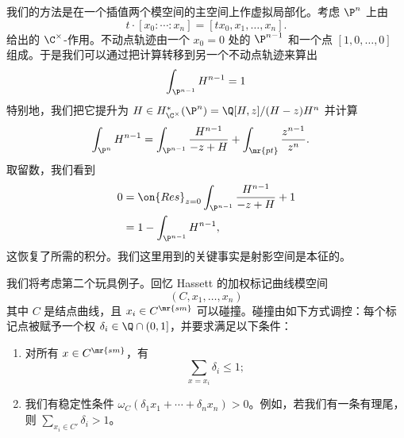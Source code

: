 我们的方法是在一个插值两个模空间的主空间上作虚拟局部化。考虑 \(\P^n\) 上由
\[ t \cdot [x_0 : \cdots : x_n] = [t x_0, x_1, \ldots, x_n]. \]
给出的 \(\C^{\times}\)-作用。不动点轨迹由一个 \(x_0 = 0\) 处的 \(\P^{n-1}\) 和一个点 \([1, 0, \ldots, 0]\) 组成。于是我们可以通过把计算转移到另一个不动点轨迹来算出
\[ \int_{\P^{n-1}} H^{n-1} = 1 \]
特别地，我们把它提升为 \(H \in H_{\C^{\times}}^* (\P^n) = \Q[H,z] / (H-z)H^n\) 并计算
\begin{align*}
    \int_{\P^n} H^{n-1} &= \int_{\P^{n-1}} \frac{H^{n-1}}{-z+H} + \int_{\mr{pt}} \frac{z^{n-1}}{z^n}.
\end{align*}
取留数，我们看到
\begin{align*}
    0 &= \on{Res}_{z = 0}\int_{\P^{n-1}} \frac{H^{n-1}}{-z+H} + 1 \\
    &= 1 - \int_{\P^{n-1}}H^{n-1},
\end{align*}
这恢复了所需的积分。我们这里用到的关键事实是射影空间是本征的。

\begin{exm}[第二个玩具例子]
    我们将考虑第二个玩具例子。回忆 Hassett 的加权标记曲线模空间
    \[ (C, x_1, \ldots, x_n) \]
    其中 \(C\) 是结点曲线，且 \(x_i \in C^{\mr{sm}}\) 可以碰撞。碰撞由如下方式调控：每个标记点被赋予一个权 \(\delta_i \in \Q \cap (0,1]\)，并要求满足以下条件：
    \begin{enumerate}
        \item 对所有 \(x \in C^{\mr{sm}}\)，有
            \[ \sum_{x = x_i} \delta_i \leq 1; \]
        \item 我们有稳定性条件 \(\omega_C(\delta_1 x_1 + \cdots + \delta_n x_n) > 0\)。例如，若我们有一条有理尾，则 \(\sum_{x_i \in C'} \delta_i > 1\)。
    \end{enumerate}
\end{exm}

